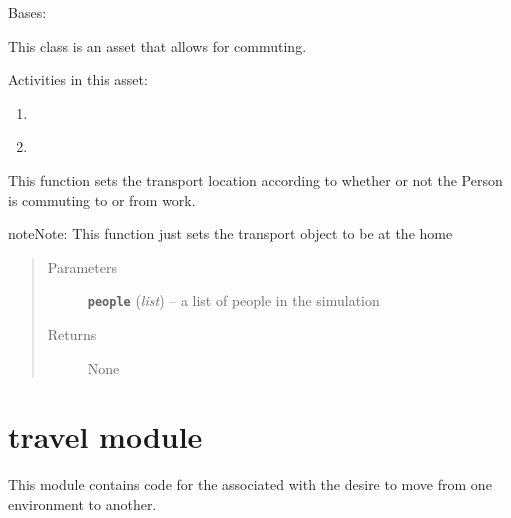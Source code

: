 \documentclass[letterpaper,10pt,english]{sphinxmanual}
\begin{document}
\begin{fulllineitems}
\label{transport:transport.Transport}
Bases: {\hyperref[asset:asset.Asset]{\emph{}}}

This class is an asset that allows for commuting.

Activities in this asset:
\begin{enumerate}
\item {} 
{\hyperref[commute:commute.Commute_To_Work]{\emph{}}}

\item {} 
{\hyperref[commute:commute.Commute_From_Work]{\emph{}}}

\end{enumerate}

\begin{fulllineitems}
\label{transport:transport.Transport.initialize}
This function sets the transport location according to whether or not the Person is commuting to or         from work.

\begin{notice}{note}{Note:}
This function just sets the transport object to be at the home
\end{notice}
\begin{quote}\begin{description}
\item[{Parameters}] \leavevmode
\textbf{\texttt{people}} (\emph{list}) -- a list of people in the simulation

\item[{Returns}] \leavevmode
None

\end{description}\end{quote}

\end{fulllineitems}


\end{fulllineitems}



\section{travel module}
\label{travel::doc}\label{travel:travel-module}\label{travel:module-travel}
This module contains code for the {\hyperref[need:need.Need]{\emph{}}} associated with the desire to move from one environment to another.
\end{document}
